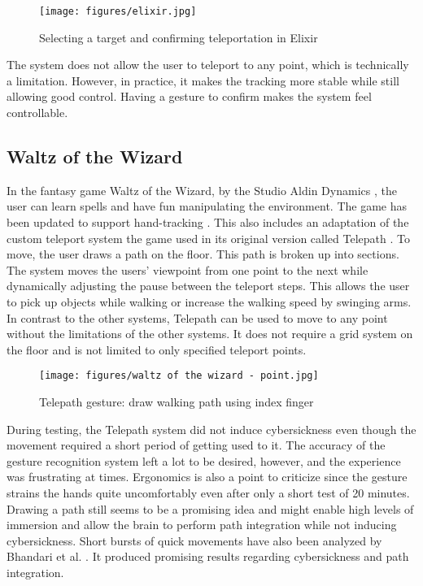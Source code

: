\begin{figure}[hbt!]
  \centering
  \texttt{[image: figures/elixir.jpg]}
  \caption{Selecting a target and confirming teleportation in Elixir}
  \label{fig:elixir}
\end{figure}

The system does not allow the user to teleport to any point, which is technically a limitation. However, in practice, it makes the tracking more stable while still allowing good control. Having a gesture to confirm makes the system feel controllable. 


\subsection{Waltz of the Wizard}
In the fantasy game Waltz of the Wizard, \cite{WaWizOculus} by the Studio Aldin Dynamics \cite{Aladin}, the user can learn spells and have fun manipulating the environment. The game has been updated to support hand-tracking \cite{WaWizBlog}. This also includes an adaptation of the custom teleport system the game used in its original version called Telepath \cite{WaWizTelePath}. To move, the user draws a path on the floor. This path is broken up into sections. The system moves the users' viewpoint from one point to the next while dynamically adjusting the pause between the teleport steps. This allows the user to pick up objects while walking or increase the walking speed by swinging arms. In contrast to the other systems, Telepath can be used to move to any point without the limitations of the other systems. It does not require a grid system on the floor and is not limited to only specified teleport points.

\begin{figure}[hbt!]
  \centering
  \texttt{[image: figures/waltz of the wizard - point.jpg]}
  \caption{Telepath gesture: draw walking path using index finger}
  \label{fig:telepath}
\end{figure}

During testing, the Telepath system did not induce cybersickness even though the movement required a short period of getting used to it. The accuracy of the gesture recognition system left a lot to be desired, however, and the experience was frustrating at times. Ergonomics is also a point to criticize since the gesture strains the hands quite uncomfortably even after only a short test of 20 minutes. Drawing a path still seems to be a promising idea and might enable high levels of immersion and allow the brain to perform path integration while not inducing cybersickness. Short bursts of quick movements have also been analyzed by Bhandari et al. \cite{Bhandari}. It produced promising results regarding cybersickness and path integration. 


